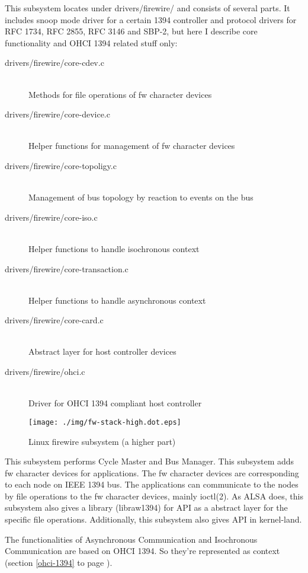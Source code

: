 \documentclass[onecolumn]{article}
\begin{document}
This subsystem locates under drivers/firewire/ and consists of several parts. It includes snoop mode driver for a certain 1394 controller and protocol drivers for RFC 1734, RFC 2855, RFC 3146 and SBP-2, but here I describe core functionality and OHCI 1394 related stuff only:

\begin{description}
\item[drivers/firewire/core-cdev.c] \mbox{} \\
Methods for file operations of fw character devices
\item[drivers/firewire/core-device.c] \mbox{} \\
Helper functions for management of fw character devices
\item[drivers/firewire/core-topoligy.c] \mbox{} \\
Management of bus topology by reaction to events on the bus
\item[drivers/firewire/core-iso.c] \mbox{} \\
Helper functions to handle isochronous context
\item[drivers/firewire/core-transaction.c] \mbox{} \\
Helper functions to handle asynchronous context
\item[drivers/firewire/core-card.c] \mbox{} \\
Abstract layer for host controller devices
\item[drivers/firewire/ohci.c] \mbox{} \\
Driver for OHCI 1394 compliant host controller
\end{description}

\begin{figure}[htbp]
	\centering
	\texttt{[image: ./img/fw-stack-high.dot.eps]}
	\caption{{Linux firewire subsystem (a higher part)}}
	\label{fw-stack-high}
\end{figure}

This subsystem performs Cycle Master and Bus Manager. This subsystem adds fw character devices for applications. The fw character devices are corresponding to each node on IEEE 1394 bus. The applications can communicate to the nodes by file operations to the fw character devices, mainly ioctl(2). As ALSA does, this subsystem also gives a library (libraw1394) for API as a abstract layer for the specific file operations. Additionally, this subsystem also gives API in kernel-land. 

The functionalities of Asynchronous Communication and Isochronous Communication are based on OHCI 1394. So they're represented as context (section \ref{ohci-1394} to page \pageref{ohci-1394}).
\end{document}
